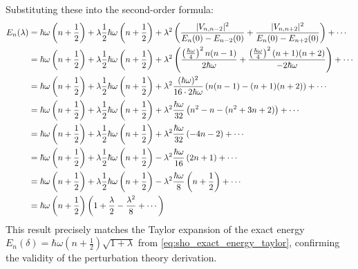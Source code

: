\begin{example}
    Substituting these into the second-order formula:
    \begin{align} \label{eq:sho_energy_second_order_full}
        E_n (\lambda) &= \hbar \omega \left (n + \frac{1}{2}\right) +
        \lambda \frac{1}{2} \hbar \omega \left(n + \frac{1}{2}\right)
        + \lambda^2 \left( \frac{|V_{n,n-2}|^2}{E_n(0) - E_{n-2}(0)}
        + \frac{|V_{n,n+2}|^2}{E_n(0) - E_{n+2}(0)} \right) + \cdots \\
        &= \hbar \omega \left (n + \frac{1}{2}\right) + \lambda
        \frac{1}{2} \hbar \omega \left(n + \frac{1}{2}\right) +
        \lambda^2 \left( \frac{\left(\frac{\hbar \omega}{4}\right)^2
            n(n-1)}{2\hbar\omega} + \frac{\left(\frac{\hbar
        \omega}{4}\right)^2 (n+1)(n+2)}{-2\hbar\omega}\right)+ \cdots \notag \\
        &= \hbar \omega \left (n + \frac{1}{2}\right) + \lambda
        \frac{1}{2} \hbar \omega \left(n + \frac{1}{2}\right) +
        \lambda^2 \frac{(\hbar \omega)^2}{16 \cdot 2\hbar\omega}
        \left( n(n-1) - (n+1)(n+2)\right)+ \cdots \notag \\
        &= \hbar \omega \left (n + \frac{1}{2}\right) + \lambda
        \frac{1}{2} \hbar \omega \left(n + \frac{1}{2}\right) +
        \lambda^2 \frac{\hbar \omega}{32} \left( n^2-n -
        (n^2+3n+2)\right)+ \cdots \notag \\
        &= \hbar \omega \left (n + \frac{1}{2}\right) + \lambda
        \frac{1}{2} \hbar \omega \left(n + \frac{1}{2}\right) +
        \lambda^2 \frac{\hbar \omega}{32} \left( -4n-2\right)+ \cdots \notag \\
        &= \hbar \omega \left (n + \frac{1}{2}\right) + \lambda
        \frac{1}{2} \hbar \omega \left(n + \frac{1}{2}\right) -
        \lambda^2 \frac{\hbar \omega}{16} \left(2n+1\right)+ \cdots \notag \\
        &= \hbar \omega \left (n + \frac{1}{2}\right) + \lambda
        \frac{1}{2} \hbar \omega \left(n + \frac{1}{2}\right) -
        \lambda^2 \frac{\hbar \omega}{8} \left(n +
        \frac{1}{2}\right)+ \cdots \notag \\
        &= \hbar\omega \left( n + \frac{1}{2}\right) \left(1 +
        \frac{\lambda}{2} - \frac{\lambda^2}{8} + \cdots\right) \notag
    \end{align}
    This result precisely matches the Taylor expansion of the exact
    energy $E_n(\delta) = \hbar\omega \left(n+\frac{1}{2}\right)
    \sqrt{1 + \lambda}$ from \eqref{eq:sho_exact_energy_taylor},
    confirming the validity of the perturbation theory derivation.
\end{example}

